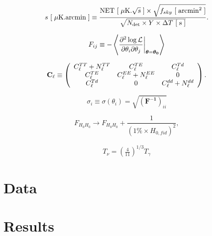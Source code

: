 \documentclass[aps,prl,preprint,groupedaddress]{revtex4-1}
\begin{document}
\begin{eqnarray}
\centering
	s\ [\;\mu {\rm K.arcmin}\;] \equiv \frac{ {\rm NET}\ [\; \mu{\rm K.}\sqrt{s}\;] \times \sqrt{f_{sky} \ [\;{\rm arcmin}^2\;] }}{ \sqrt {N_{\rm det} \times Y \times \Delta T\ [\;{\rm s }\;]}}.
	\label{eq:sensitivity_definition}
\end{eqnarray}

\begin{equation}
	\centering
		F_{ij} \equiv - \left\langle\frac{\partial^2 \log \mathcal{L}}{\partial \theta_i \partial \theta_j} \bigg|_{\boldsymbol{\theta} = \boldsymbol{\theta_0}}\right\rangle
	\label{eq:Fij_def}
\end{equation}

 \begin{eqnarray}
 	\centering
		\mathbf{C}_\ell \equiv \left( \begin{array}{ccc}C_\ell^{TT} + N_\ell^{TT} & C_\ell^{TE} & C_\ell^{Td} \\ C_\ell^{TE} & C_\ell^{EE} + N_\ell^{EE} & 0 \\ C_\ell^{Td} & 0 & C_\ell^{dd} + N_\ell^{dd}\end{array}\right).
	\label{eq:cov_definition}
\end{eqnarray}

\begin{equation}
\sigma_i \equiv \sigma (\theta_i) = \sqrt{(\mathbf{ F^{-1}})_{ii}}
\end{equation}

\begin{equation}
F_{H_0 H_0} \rightarrow F_{H_0 H_0} + \frac{1}{(1\% \times H_{0,fid})^2}, 
\end{equation}


\begin{eqnarray}
	T_{\nu} = \left( \frac{4}{11} \right)^{1/3} T_{\gamma} 
	\label{eq:tnu_propto_tgamma}
\end{eqnarray}

\section{Data}
\section{Results}
\end{document}
